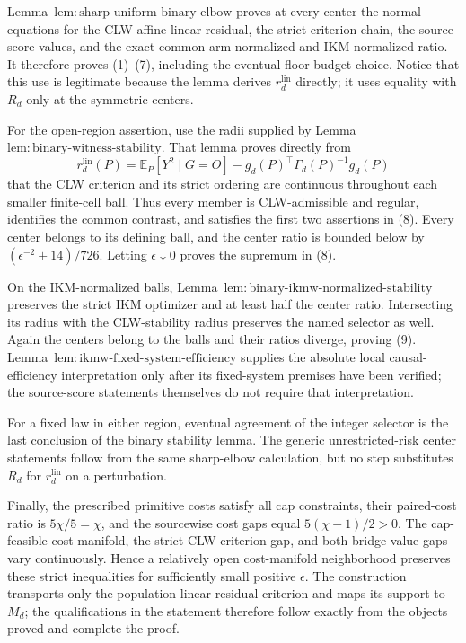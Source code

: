 Lemma~\(\mathrm{lem{:}sharp\text{-}uniform\text{-}binary\text{-}elbow}\) proves at every center the normal equations for the CLW affine linear residual, the strict criterion chain, the source-score values, and the exact common arm-normalized and IKM-normalized ratio.  It therefore proves (1)--(7), including the eventual floor-budget choice.  Notice that this use is legitimate because the lemma derives \(r_d^{\mathrm{lin}}\) directly; it uses equality with \(R_d\) only at the symmetric centers.

For the open-region assertion, use the radii supplied by Lemma~\(\mathrm{lem{:}binary\text{-}witness\text{-}stability}\).  That lemma proves directly from
\[
 r_d^{\mathrm{lin}}(P)
 =\mathbb E_P[Y^2\mid G=O]
 -g_d(P)^\top\Gamma_d(P)^{-1}g_d(P)
\]
that the CLW criterion and its strict ordering are continuous throughout each smaller finite-cell ball.  Thus every member is CLW-admissible and regular, identifies the common contrast, and satisfies the first two assertions in (8).  Every center belongs to its defining ball, and the center ratio is bounded below by \((\epsilon^{-2}+14)/726\).  Letting \(\epsilon\downarrow0\) proves the supremum in (8).

On the IKM-normalized balls, Lemma~\(\mathrm{lem{:}binary\text{-}ikmw\text{-}normalized\text{-}stability}\) preserves the strict IKM optimizer and at least half the center ratio.  Intersecting its radius with the CLW-stability radius preserves the named selector as well.  Again the centers belong to the balls and their ratios diverge, proving (9).  Lemma~\(\mathrm{lem{:}ikmw\text{-}fixed\text{-}system\text{-}efficiency}\) supplies the absolute local causal-efficiency interpretation only after its fixed-system premises have been verified; the source-score statements themselves do not require that interpretation.

For a fixed law in either region, eventual agreement of the integer selector is the last conclusion of the binary stability lemma.  The generic unrestricted-risk center statements follow from the same sharp-elbow calculation, but no step substitutes \(R_d\) for \(r_d^{\mathrm{lin}}\) on a perturbation.

Finally, the prescribed primitive costs satisfy all cap constraints, their paired-cost ratio is \(5\chi/5=\chi\), and the sourcewise cost gaps equal \(5(\chi-1)/2>0\).  The cap-feasible cost manifold, the strict CLW criterion gap, and both bridge-value gaps vary continuously.  Hence a relatively open cost-manifold neighborhood preserves these strict inequalities for sufficiently small positive \(\epsilon\).  The construction transports only the population linear residual criterion and maps its support to \(M_d\); the qualifications in the statement therefore follow exactly from the objects proved and complete the proof.